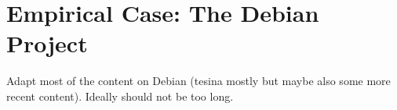
\chapter{Empirical Case: The Debian Project}

Adapt most of the content on Debian (tesina mostly but maybe also some more recent content). Ideally should not be too long.
